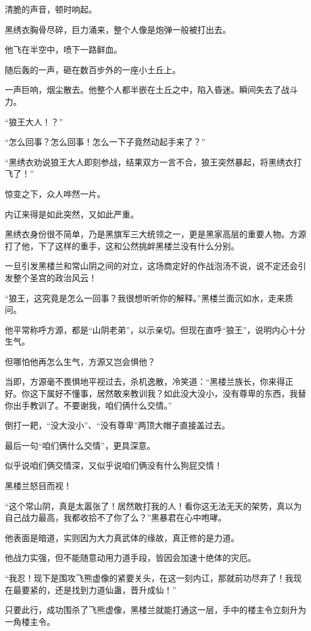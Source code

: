 \begin{this_body}
清脆的声音，顿时响起。

黑绣衣胸骨尽碎，巨力涌来，整个人像是炮弹一般被打出去。

他飞在半空中，喷下一路鲜血。

随后轰的一声，砸在数百步外的一座小土丘上。

一声巨响，烟尘散去。他整个人都半嵌在土丘之中，陷入昏迷。瞬间失去了战斗力。

“狼王大人！？”

“怎么回事？怎么回事！怎么一下子竟然动起手来了？”

“黑绣衣劝说狼王大人即刻参战，结果双方一言不合，狼王突然暴起，将黑绣衣打飞了！”

惊变之下，众人哗然一片。

内讧来得是如此突然，又如此严重。

黑绣衣身份很不简单，乃是黑旗军三大统领之一，更是黑家高层的重要人物。方源打了他，下了这样的重手，这和公然挑衅黑楼兰没有什么分别。

一旦引发黑楼兰和常山阴之间的对立，这场商定好的作战泡汤不说，说不定还会引发整个圣宫的政治风云！

“狼王，这究竟是怎么一回事？我很想听听你的解释。”黑楼兰面沉如水，走来质问。

他平常称呼方源，都是“山阴老弟”，以示亲切。但现在直呼“狼王”，说明内心十分生气。

但哪怕他再怎么生气，方源又岂会惧他？

当即，方源毫不畏惧地平视过去，杀机逸散，冷笑道：“黑楼兰族长，你来得正好。你这下属好不懂事，居然敢来教训我？如此没大没小，没有尊卑的东西，我替你出手教训了。不要谢我，咱们俩什么交情。”

倒打一耙，“没大没小”、“没有尊卑”两顶大帽子直接盖过去。

最后一句“咱们俩什么交情”，更具深意。

似乎说咱们俩交情深，又似乎说咱们俩没有什么狗屁交情！

黑楼兰怒目而视！

“这个常山阴，真是太嚣张了！居然敢打我的人！看你这无法无天的架势，真以为自己战力最高，我都收拾不了你了么？”黑暴君在心中咆哮。

他表面是暗道，实则因为大力真武体的缘故，真正修的是力道。

他战力实强，但不能随意动用力道手段，皆因会加速十绝体的灾厄。

“我忍！现下是围攻飞熊虚像的紧要关头，在这一刻内讧，那就前功尽弃了！我现在最要紧的，还是找到力道仙蛊，晋升成仙！”

只要此行，成功围杀了飞熊虚像，黑楼兰就能打通这一层，手中的楼主令立刻升为一角楼主令。


\end{this_body}
